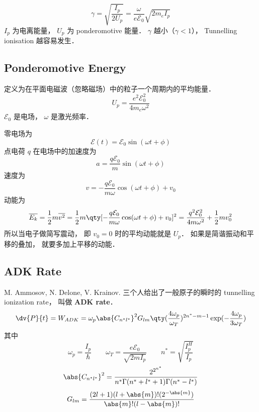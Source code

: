 
\begin{equation}
\gamma = \sqrt{\frac{I_p}{2U_p}} = \frac{\omega}{e\mathcal E_0} \sqrt{2m_e I_p}
\end{equation}
$I_p$ 为电离能量， $U_p$ 为 ponderomotive 能量． $\gamma$ 越小（$\gamma < 1$）， Tunnelling ionisation 越容易发生．

\subsection{Ponderomotive Energy}
定义为在平面电磁波（忽略磁场）中的粒子一个周期内的平均能量．
\begin{equation}
U_p = \frac{e^2 \mathcal E_0^2}{4m_e\omega^2}
\end{equation}
$\mathcal E_0$ 是电场， $\omega$ 是激光频率．

零电场为
\begin{equation}
\mathcal E(t) = \mathcal E_0 \sin(\omega t + \phi)
\end{equation}
点电荷 $q$ 在电场中的加速度为
\begin{equation}
a = \frac{q\mathcal E_0}{m} \sin(\omega t + \phi)
\end{equation}
速度为
\begin{equation}
v = -\frac{q\mathcal E_0}{m\omega} \cos(\omega t + \phi) + v_0
\end{equation}
动能为
\begin{equation}
\overline{E_k} = \frac{1}{2}m \overline{v^2} = \frac{1}{2}m \qty[-\frac{q\mathcal E_0}{m\omega} \cos(\omega t + \phi) + v_0]^2 = \frac{q^2\mathcal E_0^2}{4m\omega^2} + \frac{1}{2}mv_0^2
\end{equation}
所以当电子做简写震动， 即 $v_0 = 0$ 时的平均动能就是 $U_p$． 如果是简谐振动和平移的叠加， 就要多加上平移的动能．

\subsection{ADK Rate}
M. Ammosov, N. Delone, V. Krainov. 三个人给出了一般原子的瞬时的 tunnelling ionization rate， 叫做 \textbf{ADK rate}．
\begin{equation}
\dv{P}{t} = W_{ADK} = \omega_p \abs{C_{n^*l^*}}^2 G_{lm}\qty(\frac{4\omega_p}{\omega_T})^{2n^*-m-1}\exp(-\frac{4\omega_p}{3\omega_T})
\end{equation}
其中
\begin{equation}
\omega_p = \frac{I_p}{\hbar} \qquad \omega_T = \frac{e\mathcal E_0}{\sqrt{2mI_p}} \qquad
n^* = \sqrt{\frac{I_p^H}{I_p}}
\end{equation}
\begin{equation}
\abs{C_{n^*l^*}}^2 = \frac{2^{2^{n^*}}}{n^* \Gamma(n^* + l^* + 1) \Gamma(n^* - l^*)}
\end{equation}
\begin{equation}
G_{lm} = \frac{(2l+1)(l+\abs{m})!(2^{-\abs{m}})}{\abs{m}!(l-\abs{m})!}
\end{equation}
